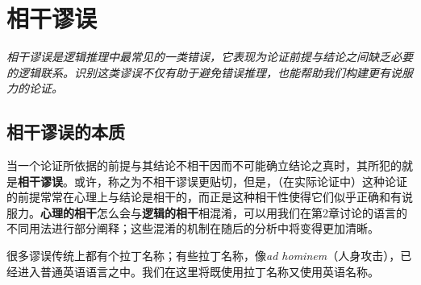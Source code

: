 \section{相干谬误}

\begin{logicbox}[title=引言]
\textit{相干谬误是逻辑推理中最常见的一类错误，它表现为论证前提与结论之间缺乏必要的逻辑联系。识别这类谬误不仅有助于避免错误推理，也能帮助我们构建更有说服力的论证。}
\end{logicbox}

\subsection{相干谬误的本质}

当一个论证所依据的前提与其结论不相干因而不可能确立结论之真时，其所犯的就是\textbf{相干谬误}。或许，称之为不相干谬误更贴切，但是，（在实际论证中）这种论证的前提常常在心理上与结论是相干的，而正是这种相干性使得它们似乎正确和有说服力。\textbf{心理的相干}怎么会与\textbf{逻辑的相干}相混淆，可以用我们在第2章讨论的语言的不同用法进行部分阐释；这些混淆的机制在随后的分析中将变得更加清晰。

很多谬误传统上都有个拉丁名称；有些拉丁名称，像\textit{ad hominem}（人身攻击），已经进入普通英语语言之中。我们在这里将既使用拉丁名称又使用英语名称。 